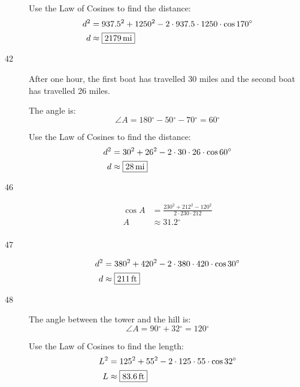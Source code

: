 \documentclass{exam}
\newcommand{\dg}{\ensuremath{^\circ}}
\begin{document}
\begin{description}
        Use the Law of Cosines to find the distance:
        \begin{align*}
          d^2 & = 937.5^2 + 1250^2 - 2 \cdot 937.5 \cdot 1250 \cdot \cos 170 \dg \\
          d   & \approx \boxed{ \unit[2179]{mi} } \\
        \end{align*}

      \item[42]
        After one hour, the first boat has travelled 30 miles and the second boat has travelled 26 miles.

        The angle is:
        \[
          \angle A = 180 \dg - 50 \dg - 70 \dg = 60 \dg
        \]

        Use the Law of Cosines to find the distance:
        \begin{align*}
          d^2 & = 30^2 + 26^2 - 2 \cdot 30 \cdot 26 \cdot \cos 60 \dg \\
          d   & \approx \boxed{ \unit[28]{mi} } \\
        \end{align*}

      \item[46]
        \begin{align*}
          \cos A & = \frac{230^2 + 212^2 - 120^2}{2 \cdot 230 \cdot 212} \\
          A      & \approx 31.2 \dg \\
        \end{align*}

      \item[47]
        \begin{align*}
          d^2 & = 380^2 + 420^2 - 2 \cdot 380 \cdot 420 \cdot \cos 30 \dg \\
          d   & \approx \boxed{ \unit[211]{ft} } \\
        \end{align*}

      \item[48]
        The angle between the tower and the hill is:
        \[
          \angle A = 90 \dg + 32 \dg = 120 \dg
        \]

        Use the Law of Cosines to find the length:
        \begin{align*}
          L^2 & = 125^2 + 55^2 - 2 \cdot 125 \cdot 55 \cdot \cos 32 \dg \\
          L   & \approx \boxed{ \unit[83.6]{ft} } \\
        \end{align*}


\end{description}
\end{document}

